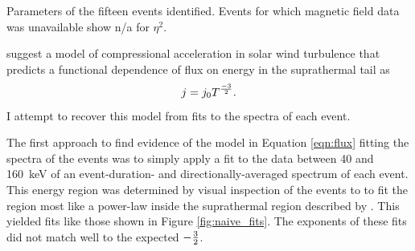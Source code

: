 \documentclass[letterpaper,11pt]{article}
\begin{document}
\begin{table}[htbp]

\caption{Parameters of the fifteen events identified.  Events for which magnetic field data was unavailable show n/a for $\eta^2$.}
\label{tab:params}
\end{table}

\citet{Fisk2006} suggest a model of compressional acceleration in solar wind turbulence that predicts a functional dependence of flux on energy in the suprathermal tail as
\begin{equation}
j = j_0 T^{-3 \over 2}.
\label{eqn:flux}
\end{equation}
I attempt to recover this model from fits to the spectra of each event.

The first approach to find evidence of the model in Equation \ref{eqn:flux} fitting the spectra of the events was to simply apply a fit to the data between 40 and \SI{160}{\kilo\electronvolt} of an event-duration- and directionally-averaged spectrum of each event.  This energy region was determined by visual inspection of the events to to fit the region most like a power-law inside the suprathermal region described by \citet{Fisk2008}. This yielded fits like those shown in Figure \ref{fig:naive_fits}.  The exponents of these fits did not match well to the expected $-{3 \over 2}$.
\end{document}
